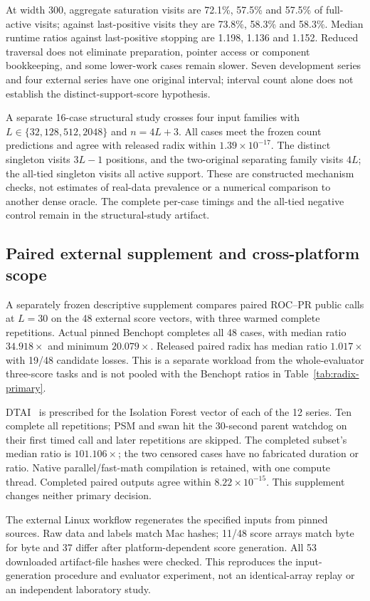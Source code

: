 At width 300, aggregate saturation visits are 72.1\%, 57.5\% and 57.5\%
of full-active visits; against last-positive visits they are 73.8\%, 58.3\%
and 58.3\%. Median runtime ratios against last-positive stopping are 1.198,
1.136 and 1.152. Reduced traversal does not eliminate preparation, pointer
access or component bookkeeping, and some lower-work cases remain slower.
Seven development series and four external series have one original interval;
interval count alone does not establish the distinct-support-score hypothesis.

A separate 16-case structural study crosses four input families with
$L\in\{32,128,512,2048\}$ and $n=4L+3$. All cases meet the frozen count
predictions and agree with released radix within $1.39\times10^{-17}$.
The distinct singleton visits $3L-1$ positions, and the two-original
separating family visits $4L$; the all-tied singleton visits all active
support. These are constructed mechanism checks, not estimates of
real-data prevalence or a numerical comparison to another dense oracle.
The complete per-case timings and the all-tied negative control remain
in the structural-study artifact.

\subsection{Paired external supplement and cross-platform scope}
A separately frozen descriptive supplement compares paired ROC--PR public
calls at $L=30$ on the 48 external score vectors, with three warmed complete
repetitions. Actual pinned Benchopt completes all 48 cases, with median
ratio $34.918\times$ and minimum $20.079\times$. Released paired radix has
median ratio $1.017\times$ with 19/48 candidate losses. This is a separate
workload from the whole-evaluator three-score tasks and is not pooled with
the Benchopt ratios in Table~\ref{tab:radix-primary}.

DTAI~\cite{dtaianomaly} is prescribed for the Isolation Forest vector of each of the 12 series.
Ten complete all repetitions; PSM and swan hit the 30-second parent watchdog
on their first timed call and later repetitions are skipped. The completed
subset's median ratio is $101.106\times$; the two censored cases have no
fabricated duration or ratio. Native parallel/fast-math compilation is
retained, with one compute thread. Completed paired outputs agree within
$8.22\times10^{-15}$. This supplement changes neither primary decision.

The external Linux workflow regenerates the specified inputs from pinned
sources. Raw data and labels match Mac hashes; 11/48 score arrays match
byte for byte and 37 differ after platform-dependent score generation.
All 53 downloaded artifact-file hashes were checked. This reproduces the
input-generation procedure and evaluator experiment, not an identical-array
replay or an independent laboratory study.

